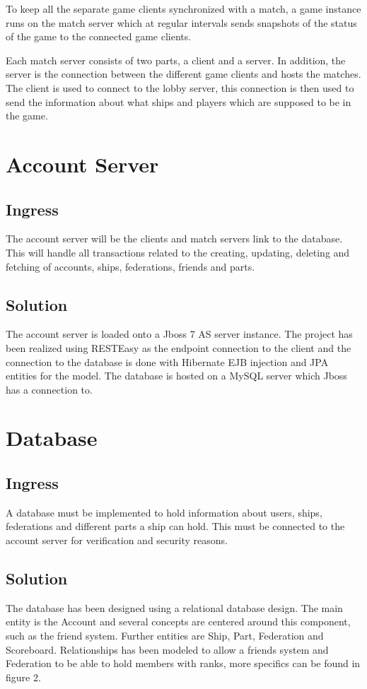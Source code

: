 \documentclass[11pt]{report}
\begin{document}
To keep all the separate game clients synchronized with a match, a game instance runs on the match server which at regular intervals sends snapshots of the status of the game to the connected game clients. 

Each match server consists of two parts, a client and a server. In addition, the server is the connection between the different game clients and hosts the matches. The client is used to connect to the lobby server, this connection is then used to send the information about what ships and players which are supposed to be in the game.
\section{Account Server}
\subsection{Ingress}

The account server will be the clients and match servers link to the database. This will handle all transactions related to the creating, updating, deleting and fetching of accounts, ships, federations, friends and parts.
\subsection{Solution}

The account server is loaded onto a Jboss 7 AS server instance. The project has been realized using RESTEasy as the endpoint connection to the client and the connection to the database is done with Hibernate EJB injection and JPA entities for the model. The database is hosted on a MySQL server which Jboss has a connection to.
\section{Database}
\subsection{Ingress}

A database must be implemented to hold information about users, ships, federations and different parts a ship can hold. This must be connected to the account server for verification and security reasons.
\subsection{Solution}

The database has been designed using a relational database design. The main entity is the Account and several concepts are centered around this component, such as the friend system. Further entities are Ship, Part, Federation and Scoreboard. Relationships has been modeled to allow a friends system and Federation to be able to hold members with ranks, more specifics can be found in figure 2.
\end{document}
